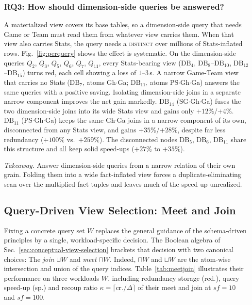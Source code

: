 \documentclass[sigconf]{acmart}
\begin{document}
\subsubsection{RQ3: How should dimension-side queries be answered?}
\label{sec:exp:rq3}
A materialized view covers its base tables, so a dimension-side query that needs \textsf{Game} or \textsf{Team} must read them from whatever view carries them. When that view also carries \textsf{Stats}, the query needs a \textsc{distinct} over millions of \textsf{Stats}-inflated rows.
Fig.~\ref{fig:perquery} shows the effect is systematic. On the dimension-side queries $Q_2$, $Q_3$, $Q_5$, $Q_6$, $Q_7$, $Q_{11}$, every \textsf{Stats}-bearing view ($\mathrm{DB}_4$, $\mathrm{DB}_8$--$\mathrm{DB}_{10}$, $\mathrm{DB}_{12}$--$\mathrm{DB}_{15}$) turns red, each cell showing a loss of $1$--$3$\,s. A narrow \textsf{Game}-\textsf{Team} view that carries no \textsf{Stats} ($\mathrm{DB}_7$, atoms Gh$\cdot$Ga; $\mathrm{DB}_{11}$, atoms PS$\cdot$Gh$\cdot$Ga) answers the same queries with a positive saving. %
Isolating dimension-side joins in a separate narrow component improves the net gain markedly. $\mathrm{DB}_{14}$ (SG$\cdot$Gh$\cdot$Ga) fuses the two dimension-side joins into its wide \textsf{Stats} view and gains only $+12\%$/$+4\%$. $\mathrm{DB}_{11}$ (PS$\cdot$Gh$\cdot$Ga) keeps the same Gh$\cdot$Ga joins in a narrow component of its own, disconnected from any \textsf{Stats} view, and gains $+35\%$/$+28\%$, despite far less redundancy ($+100\%$ vs.\ $+259\%$). The disconnected nodes $\mathrm{DB}_5$, $\mathrm{DB}_6$, $\mathrm{DB}_{11}$ share this structure and all keep solid speed-ups ($+27\%$ to $+35\%$).

\noindent\emph{Takeaway.} Answer dimension-side queries from a narrow relation of their own grain. Folding them into a wide fact-inflated view forces a duplicate-eliminating scan over the multiplied fact tuples and leaves much of the speed-up unrealized.


\subsection{Query-Driven View Selection: Meet and Join}
\label{sec:exp:meetjoin}

Fixing a concrete query set $W$ replaces the general guidance of the schema-driven principles by a single, workload-specific decision. The Boolean algebra of Sec.~\ref{sec:conceptual-view-selection} brackets that decision with two canonical choices: The \emph{join} $\sqcup W$ and \emph{meet} $\sqcap W$. Indeed, $\sqcap W$ and $\sqcup W$ are the atom-wise intersection and union of the query indices. Table~\ref{tab:meetjoin} illustrates their performance on three workloads $W$, including redundancy storage (red.), query speed-up (sp.) and recoup ratio $\kappa=\lceil\mathrm{cr.}/\Delta\rceil$ of their meet and join at $sf=10$ and $sf=100$.
\end{document}
